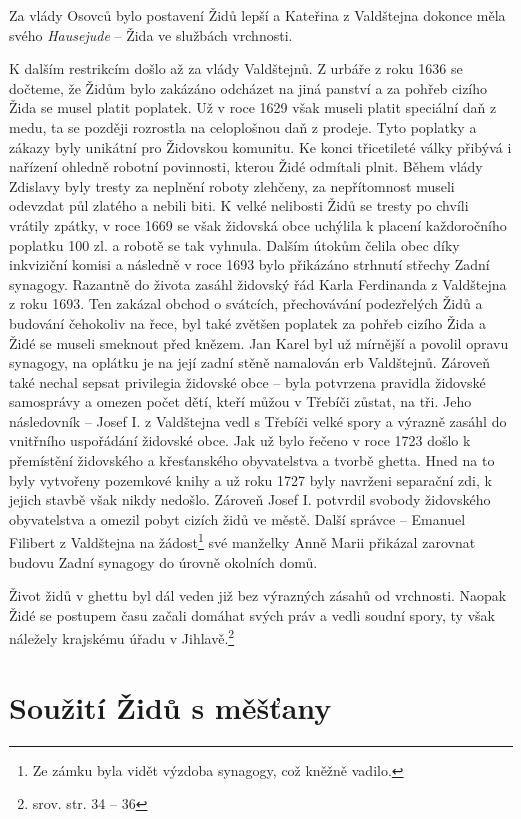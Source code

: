 \documentclass[a4paper,oneside,12pt]{report}
\begin{document}
Za vlády Osovců bylo postavení Židů lepší a Kateřina z Valdštejna dokonce měla svého \textit{Hausejude} -- Žida ve službách vrchnosti.

K dalším restrikcím došlo až za vlády Valdštejnů.
Z urbáře z roku 1636 se dočteme, že Židům bylo zakázáno odcházet na jiná panství a za pohřeb cizího Žida se musel platit poplatek.
Už v roce 1629 však museli platit speciální daň z medu, ta se později rozrostla na celoplošnou daň z prodeje.
Tyto poplatky a zákazy byly unikátní pro Židovskou komunitu.
Ke konci třicetileté války přibývá i nařízení ohledně robotní povinnosti, kterou Židé odmítali plnit.
Během vlády Zdislavy byly tresty za neplnění roboty zlehčeny, za nepřítomnost museli odevzdat půl zlatého a nebili biti.
K velké nelibosti Židů se tresty po chvíli vrátily zpátky, v roce 1669 se však židovská obce uchýlila k placení každoročního poplatku 100 zl. a robotě se tak vyhnula.
Dalším útokům čelila obec díky inkviziční komisi a následně v roce 1693 bylo přikázáno strhnutí střechy Zadní synagogy.
Razantně do života zasáhl židovský řád Karla Ferdinanda z Valdštejna z roku 1693.
Ten zakázal obchod o svátcích, přechovávání podezřelých Židů a budování čehokoliv na řece, byl také zvětšen poplatek za pohřeb cizího Žida a Židé se museli smeknout před knězem.
Jan Karel byl už mírnější a povolil opravu synagogy, na oplátku je na její zadní stěně namalován erb Valdštejnů.
Zároveň také nechal sepsat privilegia židovské obce -- byla potvrzena pravidla židovské samosprávy a omezen počet dětí, kteří můžou v Třebíči zůstat, na tři.
Jeho následovník -- Josef I. z Valdštejna vedl s Třebíči velké spory a výrazně zasáhl do vnitřního uspořádání židovské obce.
Jak už bylo řečeno v roce 1723 došlo k přemístění židovského a křesťanského obyvatelstva a tvorbě ghetta.
Hned na to byly vytvořeny pozemkové knihy a už roku 1727 byly navrženi separační zdi, k jejich stavbě však nikdy nedošlo.
Zároveň Josef I. potvrdil svobody židovského obyvatelstva a omezil pobyt cizích židů ve městě.
Další správce -- Emanuel Filibert z Valdštejna na žádost\footnote{Ze zámku byla vidět výzdoba synagogy, což kněžně vadilo.} své manželky Anně Marii přikázal zarovnat budovu Zadní synagogy do úrovně okolních domů.

Život židů v ghettu byl dál veden již bez výrazných zásahů od vrchnosti.
Naopak Židé se postupem času začali domáhat svých práv a vedli soudní spory, ty však náležely krajskému úřadu v Jihlavě.\footnote{srov. \cite{Fiser2005} str. 34 -- 36}

\section{Soužití Židů s měšťany}
\end{document}
